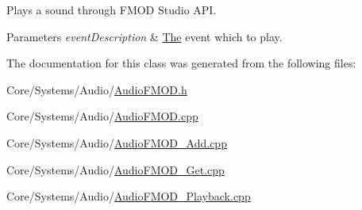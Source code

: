 Plays a sound through F\-M\-O\-D Studio A\-P\-I. 


\begin{DoxyParams}{Parameters}
{\em event\-Description} & \hyperlink{classThe}{The} event which to play. \\
\hline
\end{DoxyParams}


The documentation for this class was generated from the following files\-:\begin{DoxyCompactItemize}
\item 
Core/\-Systems/\-Audio/\hyperlink{AudioFMOD_8h}{Audio\-F\-M\-O\-D.\-h}\item 
Core/\-Systems/\-Audio/\hyperlink{AudioFMOD_8cpp}{Audio\-F\-M\-O\-D.\-cpp}\item 
Core/\-Systems/\-Audio/\hyperlink{AudioFMOD__Add_8cpp}{Audio\-F\-M\-O\-D\-\_\-\-Add.\-cpp}\item 
Core/\-Systems/\-Audio/\hyperlink{AudioFMOD__Get_8cpp}{Audio\-F\-M\-O\-D\-\_\-\-Get.\-cpp}\item 
Core/\-Systems/\-Audio/\hyperlink{AudioFMOD__Playback_8cpp}{Audio\-F\-M\-O\-D\-\_\-\-Playback.\-cpp}\end{DoxyCompactItemize}
